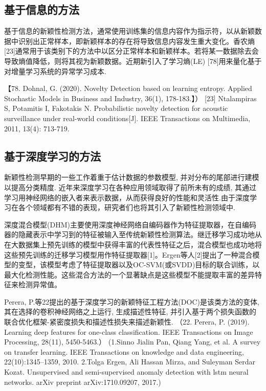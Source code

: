 \documentclass{Style/aas}
\begin{document}
\begin{multicols}{2}
  \subsection{基于信息的方法}
  基于信息的新颖性检测方法，通常使用训练集的信息内容作为指示符，以从新颖数据中识别出正常样本，即新颖样本的存在将导致信息内容发生重大变化。香农熵[23]通常用于该类别下的方法中以区分正常样本和新颖样本。若将某一数据除去会导致熵值降低，则将其视为新颖数据。近期新引入了学习熵(LE) [78]用来量化基于对增量学习系统的异常学习成本.

  【78.	Dohnal, G. (2020). Novelty Detection based on learning entropy. Applied Stochastic Models in Business and Industry, 36(1), 178-183.】）
  [23] Ntalampiras S, Potamitis I, Fakotakis N. Probabilistic novelty detection for acoustic surveillance under real-world conditions[J]. IEEE Transactions on Multimedia, 2011, 13(4): 713-719.

  \subsection{基于深度学习的方法}

  新颖性检测早期的一些工作着重于估计数据的参数模型, 并对分布的尾部进行建模以提高分类精度. 近年来深度学习在各种应用领域取得了前所未有的成绩, 其通过学习用神经网络的嵌入者来表示数据，从而获得良好的性能和灵活性.由于深度学习在各个领域都有不错的表现，研究者们也将其引入了新颖性检测领域中.

  深度混合模型(DHM)主要使用深度神经网络自编码器作为特征提取器，在自编码器的隐藏表示中学习到的特征被输入至传统新颖性检测算法。继迁移学习成功地从在大数据集上预先训练的模型中获得丰富的代表性特征之后，混合模型也成功地将这些预先训练的迁移学习模型用作特征提取器[1]。Ergen等人[2]提出了一种混合模型的变型，该模型考虑了特征提取器以及OC-SVM(或SVDD)目标的联合训练，以最大化检测性能。这些混合方法的一个显著缺点是这些模型不能提取丰富的差异特征来检测异常值。

  Perera, P.等22提出的基于深度学习的新颖特征工程方法(DOC)是该类方法的变体, 其在选择的卷积神经网络之上运行, 生成描述性特征, 并引入基于两个损失函数的联合优化框架-紧密度损失和描述性损失来描述新颖性. （22.	Perera, P. (2019). Learning deep features for one-class classification. IEEE Transactions on Image Processing, 28(11), 5450-5463.）
  (1.Sinno Jialin Pan, Qiang Yang, et al. A survey on transfer learning. IEEE Transactions on knowledge and data engineering, 22(10):1345–1359, 2010.
  2.Tolga Ergen, Ali Hassan Mirza, and Suleyman Serdar Kozat. Unsupervised and semi-supervised anomaly detection with lstm neural networks. arXiv preprint arXiv:1710.09207, 2017.)


\end{multicols}
\end{document}

